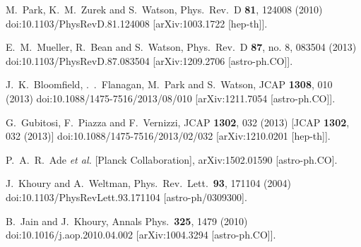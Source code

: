 \documentclass[useAMS,12pt]{article}
\begin{document}
\begin{thebibliography}{}
  M.~Park, K.~M.~Zurek and S.~Watson,
  Phys.\ Rev.\ D {\bf 81}, 124008 (2010)
  doi:10.1103/PhysRevD.81.124008
  [arXiv:1003.1722 [hep-th]].

  E.~M.~Mueller, R.~Bean and S.~Watson,
  Phys.\ Rev.\ D {\bf 87}, no. 8, 083504 (2013)
  doi:10.1103/PhysRevD.87.083504
  [arXiv:1209.2706 [astro-ph.CO]].

  J.~K.~Bloomfield, .~.~Flanagan, M.~Park and S.~Watson,
  JCAP {\bf 1308}, 010 (2013)
  doi:10.1088/1475-7516/2013/08/010
  [arXiv:1211.7054 [astro-ph.CO]].


  G.~Gubitosi, F.~Piazza and F.~Vernizzi,
  JCAP {\bf 1302}, 032 (2013)
  [JCAP {\bf 1302}, 032 (2013)]
  doi:10.1088/1475-7516/2013/02/032
  [arXiv:1210.0201 [hep-th]].

  P.~A.~R.~Ade {\it et al.} [Planck Collaboration],
  arXiv:1502.01590 [astro-ph.CO].

  J.~Khoury and A.~Weltman,
  Phys.\ Rev.\ Lett.\  {\bf 93}, 171104 (2004)
  doi:10.1103/PhysRevLett.93.171104
  [astro-ph/0309300].


  B.~Jain and J.~Khoury,
  Annals Phys.\  {\bf 325}, 1479 (2010)
  doi:10.1016/j.aop.2010.04.002
  [arXiv:1004.3294 [astro-ph.CO]].



\end{thebibliography}
\end{document}
